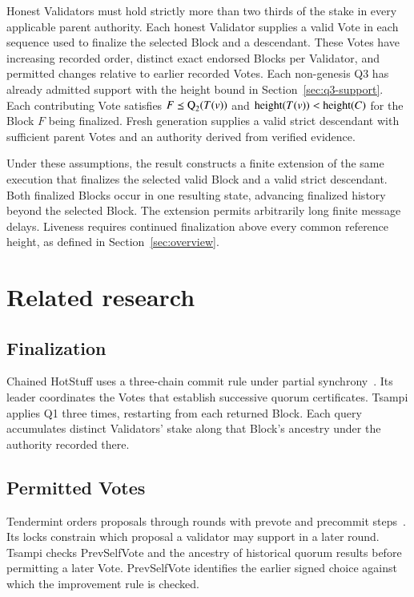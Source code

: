 Honest Validators must hold strictly more than two thirds of the stake in every applicable parent authority.
Each honest Validator supplies a valid Vote in each sequence used to finalize the selected Block and a descendant.
These Votes have increasing recorded order, distinct exact endorsed Blocks per Validator, and permitted changes relative to earlier recorded Votes.
Each non-genesis Q3 has already admitted support with the height bound in Section~\ref{sec:q3-support}.
Each contributing Vote satisfies $F\preceq\operatorname{Q}_{2}(T(v))$ and $\operatorname{height}(T(v))<\operatorname{height}(C)$ for the Block $F$ being finalized.
Fresh generation supplies a valid strict descendant with sufficient parent Votes and an authority derived from verified evidence.

Under these assumptions, the result constructs a finite extension of the same execution that finalizes the selected valid Block and a valid strict descendant.
Both finalized Blocks occur in one resulting state, advancing finalized history beyond the selected Block.
The extension permits arbitrarily long finite message delays.
Liveness requires continued finalization above every common reference height, as defined in Section~\ref{sec:overview}.

\section{Related research}\label{sec:related}

\subsection{Finalization}

Chained HotStuff uses a three-chain commit rule under partial synchrony~\citep[Sections 4--5]{rw-hotstuff}.
Its leader coordinates the Votes that establish successive quorum certificates.
Tsampi applies Q1 three times, restarting from each returned Block.
Each query accumulates distinct Validators' stake along that Block's ancestry under the authority recorded there.

\subsection{Permitted Votes}

Tendermint orders proposals through rounds with prevote and precommit steps~\citep[Section III, Algorithm 1]{rw-tendermint}.
Its locks constrain which proposal a validator may support in a later round.
Tsampi checks PrevSelfVote and the ancestry of historical quorum results before permitting a later Vote.
PrevSelfVote identifies the earlier signed choice against which the improvement rule is checked.

